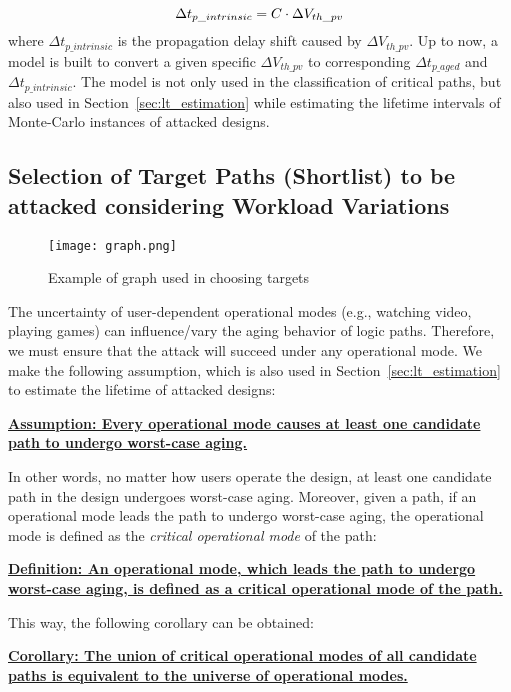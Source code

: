 \begin{equation}
	\centering
	\fontsize{9}{9} \selectfont
	\Delta t_{p\_intrinsic} = C \cdot \Delta V_{th\_pv}
	\label{eq:vtodelay2}
\end{equation}	
where $\Delta t_{p\_intrinsic}$ is the propagation delay shift caused by $\Delta V_{th\_pv}$. Up to now, a model is built to convert a given specific $\Delta V_{th\_pv}$ to corresponding $\Delta t_{p\_aged}$ and $\Delta t_{p\_intrinsic}$. The model is not only used in the classification of critical paths, but also used in Section~\ref{sec:lt_estimation} while estimating the lifetime intervals of Monte-Carlo instances of attacked designs. 
\subsection{Selection of Target Paths (Shortlist) to be attacked considering Workload Variations}
\label{sec:frame:workload}
\begin{figure}
	\centering
	\texttt{[image: graph.png]}
	\caption{Example of graph used in choosing targets}
	\label{fig:graph}
\end{figure}

The uncertainty of user-dependent operational modes (e.g., watching video, playing games) can influence/vary the aging behavior of logic paths. Therefore, we must ensure that the attack will succeed under any operational mode. We make the following assumption, which is also used in Section~\ref{sec:lt_estimation} to estimate the lifetime of attacked designs:

\noindent \textbf{\uline{Assumption: Every operational mode causes at least one candidate path to undergo worst-case aging.}}

In other words, no matter how users operate the design, at least one candidate path in the design undergoes worst-case aging. Moreover, given a path, if an operational mode leads the path to undergo worst-case aging, the operational mode is defined as the \textit{critical operational mode} of the path:

\noindent \textbf{\uline{Definition: An operational mode, which leads the path to undergo worst-case aging, is defined as a critical operational mode of the path.}}

This way, the following corollary can be obtained:

\noindent \textbf{\uline{Corollary: The union of critical operational modes of all candidate paths is equivalent to the universe of operational modes.}}

